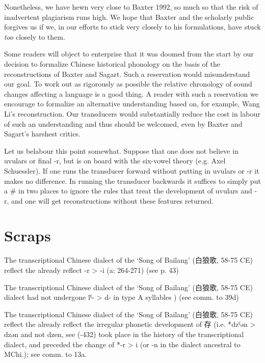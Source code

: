 \documentclass[xetex, svgnames, 12pt]{scrartcl}
\begin{document}
Nonetheless, we have hewn very close to Baxter 1992, so much so that the risk of inadvertent plagiarism runs high. We hope that Baxter and the scholarly public forgives us if we, in our efforts to stick very closely to his formulations, have stuck \textit{too} closely to them. 

Some readers will object to enterprise that it was doomed from the start by our decision to formalize Chinese historical phonology on the basis of the reconstructions of Baxter and Sagart. Such a reservation would misunderstand our goal. To work out as rigorously as possible the relative chronology of sound changes affecting a language is a good thing. A reader with such a reservation we encourage to formalize an alternative understanding based on, for example, Wang Li's reconstruction. Our transducers would substantially reduce the cost in labour of such an understanding and thus should be welcomed, even by Baxter and Sagart's harshest critics. 

Let us belabour this point somewhat. Suppose that one does not believe in uvulars or final -r, but is on board with the six-vowel theory (e.g. Axel Schuessler). If one runs the transducer forward without putting in uvulars or -r it makes no difference. In running the transducer backwards it suffices to simply put a \# in two places to ignore the rules that treat the development of uvulars and -r, and one will get reconstructions without these features returned. 


\section{Scraps}
The transcriptional Chinese dialect of the `Song of Bailang' (白狼歌, 58-75 CE) reflect the already reflect -r > -i (\cite{Baxter2014OldChinese}a: 264-271) (see p. 43)

The transcriptional Chinese dialect of the `Song of Bailang' (白狼歌, 58-75 CE) dialect had not undergone 
 lˤ- > d- in type A syllables \citep[197]{Baxter1992}) (see comm. to 39d)
 




The transcriptional Chinese dialect of the `Song of Bailang' (白狼歌, 58-75 CE) reflect the already reflect the irregular phonetic development of 存 (i.e. *dzˤən > dzən and not dzen, see (\citep[431]{Baxter1992}-432) took place in the history of the transcriptional dialect, and preceded the change of *-r > i (or -n in the dialect ancestral to MChi.); see comm. to 13a.
\end{document}
